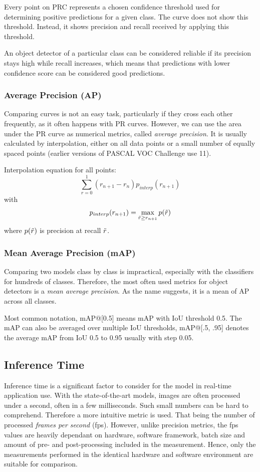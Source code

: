 Every point on PRC represents a chosen confidence threshold used for determining positive predictions for a given class. The curve does not show this threshold. Instead, it shows precision and recall received by applying this threshold.

An object detector of a particular class can be considered reliable if its precision stays high while recall increases, which means that predictions with lower confidence score can be considered good predictions.

\subsubsection{Average Precision (AP)}
Comparing curves is not an easy task, particularly if they cross each other frequently, as it often happens with PR curves. However, we can use the area under the PR curve as numerical metrics, called \textit{average precision}. It is usually calculated by interpolation, either on all data points or a small number of equally spaced points (earlier versions of PASCAL VOC Challenge use 11).

Interpolation equation for all points:
$$\sum_{r=0}^1 (r_{n+1} - r_n ) p_{interp}(r_{n+1})$$
with
$$p_{interp}(r_{n+1}) = \max_{\Tilde{r} \geq r_{n+1}} p(\Tilde{r})$$
where $p(\Tilde{r})$ is precision at recall $\Tilde{r}$.

\subsubsection{Mean Average Precision (mAP)}
Comparing two models class by class is impractical, especially with the classifiers for hundreds of classes. Therefore, the most often used metrics for object detectors is a \textit{mean average precision}. As the name suggests, it is a mean of AP across all classes.

Most common notation, mAP@[0.5] means mAP with IoU threshold 0.5. The mAP can also be averaged over multiple IoU thresholds, mAP@[.5, .95] denotes the average mAP from IoU 0.5 to 0.95 usually with step 0.05.

\subsection{Inference Time}
Inference time is a significant factor to consider for the model in real-time application use. With the state-of-the-art models, images are often processed under a second, often in a few milliseconds. Such small numbers can be hard to comprehend. Therefore a more intuitive metric is used. That being the number of processed \textit{frames per second} (fps). However, unlike precision metrics, the fps values are heavily dependant on hardware, software framework, batch size and amount of pre- and post-processing included in the measurement. Hence, only the measurements performed in the identical hardware and software environment are suitable for comparison.

